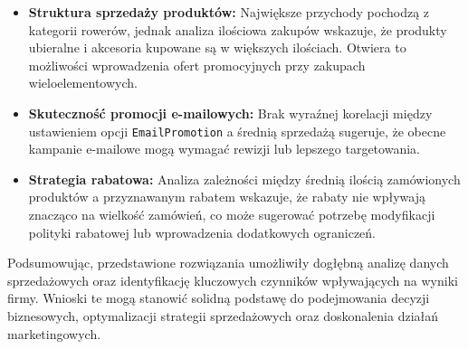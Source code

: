 \documentclass[a4paper,12pt]{article}
\begin{document}
\begin{enumerate}
\begin{itemize}
        \item \textbf{Struktura sprzedaży produktów:}
        Największe przychody pochodzą z kategorii rowerów, jednak analiza ilościowa zakupów wskazuje, że produkty ubieralne i akcesoria kupowane są w większych ilościach. Otwiera to możliwości wprowadzenia ofert promocyjnych przy zakupach wieloelementowych.
        
        \item \textbf{Skuteczność promocji e-mailowych:}  
        Brak wyraźnej korelacji między ustawieniem opcji \texttt{EmailPromotion} a średnią sprzedażą sugeruje, że obecne kampanie e-mailowe mogą wymagać rewizji lub lepszego targetowania.
        
        \item \textbf{Strategia rabatowa:}  
        Analiza zależności między średnią ilością zamówionych produktów a przyznawanym rabatem wskazuje, że rabaty nie wpływają znacząco na wielkość zamówień, co może sugerować potrzebę modyfikacji polityki rabatowej lub wprowadzenia dodatkowych ograniczeń.
    \end{itemize}
\end{enumerate}

Podsumowując, przedstawione rozwiązania umożliwiły dogłębną analizę danych sprzedażowych oraz identyfikację kluczowych czynników wpływających na wyniki firmy. Wnioski te mogą stanowić solidną podstawę do podejmowania decyzji biznesowych, optymalizacji strategii sprzedażowych oraz doskonalenia działań marketingowych.

\printbibliography
\end{document}
